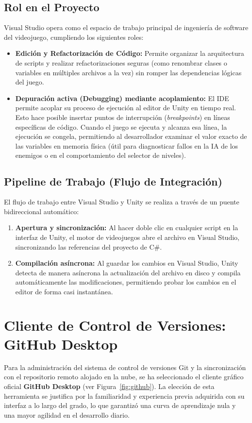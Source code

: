 \subsection{Rol en el Proyecto}
Visual Studio opera como el espacio de trabajo principal de ingeniería de software del videojuego, cumpliendo los siguientes roles:
\begin{itemize}
    \item \textbf{Edición y Refactorización de Código:} Permite organizar la arquitectura de scripts y realizar refactorizaciones seguras (como renombrar clases o variables en múltiples archivos a la vez) sin romper las dependencias lógicas del juego.
    
    \item \textbf{Depuración activa (Debugging) mediante acoplamiento:} El IDE permite acoplar su proceso de ejecución al editor de Unity en tiempo real. Esto hace posible insertar puntos de interrupción (\textit{breakpoints}) en líneas específicas de código. Cuando el juego se ejecuta y alcanza esa línea, la ejecución se congela, permitiendo al desarrollador examinar el valor exacto de las variables en memoria física (útil para diagnosticar fallos en la IA de los enemigos o en el comportamiento del selector de niveles).
\end{itemize}

\subsection{Pipeline de Trabajo (Flujo de Integración)}
El flujo de trabajo entre Visual Studio y Unity se realiza a través de un puente bidireccional automático:
\begin{enumerate}
    \item \textbf{Apertura y sincronización:} Al hacer doble clic en cualquier script en la interfaz de Unity, el motor de videojuegos abre el archivo en Visual Studio, sincronizando las referencias del proyecto de C\#.
    \item \textbf{Compilación asíncrona:} Al guardar los cambios en Visual Studio, Unity detecta de manera asíncrona la actualización del archivo en disco y compila automáticamente las modificaciones, permitiendo probar los cambios en el editor de forma casi instantánea.
\end{enumerate}

\section{Cliente de Control de Versiones: GitHub Desktop \cite{git}}
Para la administración del sistema de control de versiones Git y la sincronización con el repositorio remoto alojado en la nube, se ha seleccionado el cliente gráfico oficial \textbf{GitHub Desktop} (ver Figura~\ref{fig:github}). La elección de esta herramienta se justifica por la familiaridad y experiencia previa adquirida con su interfaz a lo largo del grado, lo que garantizó una curva de aprendizaje nula y una mayor agilidad en el desarrollo diario.

